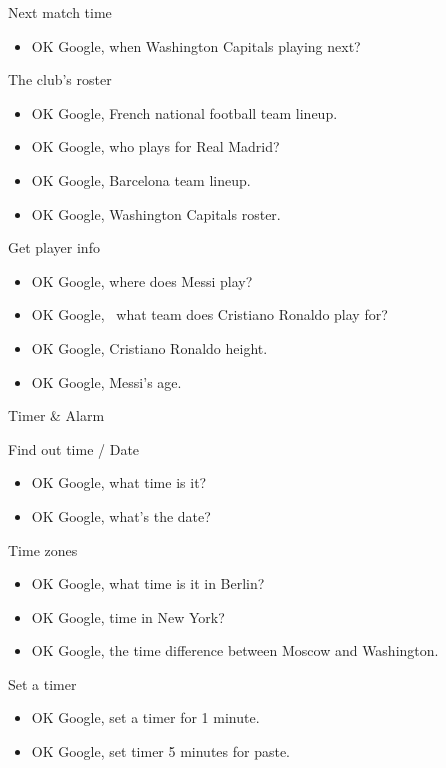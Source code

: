 \documentclass[
  letterpaper,
  DIV=11,
  numbers=noendperiod]{scrartcl}
\providecommand{\tightlist}{%
  \setlength{\itemsep}{0pt}\setlength{\parskip}{0pt}}\usepackage{longtable,booktabs,array}
\begin{document}
Next match time

\begin{itemize}
\tightlist
\item
  OK Google, when Washington Capitals playing next?
\end{itemize}

The club's roster

\begin{itemize}
\item
  OK Google, French national football team lineup.
\item
  OK Google, who plays for Real Madrid?
\item
  OK Google, Barcelona team lineup.
\item
  OK Google, Washington Capitals roster.
\end{itemize}

Get player info

\begin{itemize}
\item
  OK Google, where does Messi play?
\item
  OK Google,~ what team does Cristiano Ronaldo play for?
\item
  OK Google, Cristiano Ronaldo height.
\item
  OK Google, Messi's age.
\end{itemize}

Timer \& Alarm

Find out time / Date

\begin{itemize}
\item
  OK Google, what time is it?
\item
  OK Google, what's the date?
\end{itemize}

Time zones

\begin{itemize}
\item
  OK Google, what time is it in Berlin?
\item
  OK Google, time in New York?
\item
  OK Google, the time difference between Moscow and Washington.
\end{itemize}

Set a timer

\begin{itemize}
\item
  OK Google, set a timer for 1 minute.
\item
  OK Google, set timer 5 minutes for paste.
\end{itemize}
\end{document}
